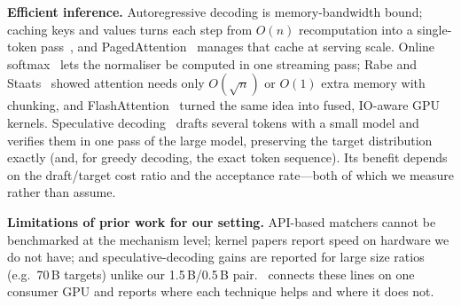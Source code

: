 \textbf{Efficient inference.} Autoregressive decoding is memory-bandwidth bound; caching keys and values
turns each step from $O(n)$ recomputation into a single-token pass~\cite{pope2023scaling}, and
PagedAttention~\cite{kwon2023paged} manages that cache at serving scale. Online softmax~\cite{milakov2018online}
lets the normaliser be computed in one streaming pass; Rabe and Staats~\cite{rabe2021selfattention} showed
attention needs only $O(\sqrt{n})$ or $O(1)$ extra memory with chunking, and
FlashAttention~\cite{dao2022flashattention,dao2024flashattention2} turned the same idea into fused,
IO-aware GPU kernels. Speculative decoding~\cite{leviathan2023speculative,chen2023speculative} drafts several
tokens with a small model and verifies them in one pass of the large model, preserving the target
distribution exactly (and, for greedy decoding, the exact token sequence). Its benefit depends on the
draft/target cost ratio and the acceptance rate---both of which we measure rather than assume.

\textbf{Limitations of prior work for our setting.} API-based matchers cannot be benchmarked at the
mechanism level; kernel papers report speed on hardware we do not have; and speculative-decoding gains are
reported for large size ratios (e.g.\ 70\,B targets) unlike our 1.5\,B/0.5\,B pair. \sys\ connects these
lines on one consumer GPU and reports where each technique helps and where it does not.
